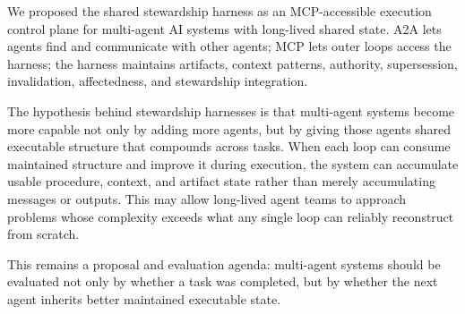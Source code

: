 \documentclass{article}
\begin{document}
We proposed the shared stewardship harness as an MCP-accessible execution control plane for multi-agent AI systems with long-lived shared state. A2A lets agents find and communicate with other agents; MCP lets outer loops access the harness; the harness maintains artifacts, context patterns, authority, supersession, invalidation, affectedness, and stewardship integration.

The hypothesis behind stewardship harnesses is that multi-agent systems become more capable not only by adding more agents, but by giving those agents shared executable structure that compounds across tasks. When each loop can consume maintained structure and improve it during execution, the system can accumulate usable procedure, context, and artifact state rather than merely accumulating messages or outputs. This may allow long-lived agent teams to approach problems whose complexity exceeds what any single loop can reliably reconstruct from scratch.

This remains a proposal and evaluation agenda: multi-agent systems should be evaluated not only by whether a task was completed, but by whether the next agent inherits better maintained executable state.
\end{document}
